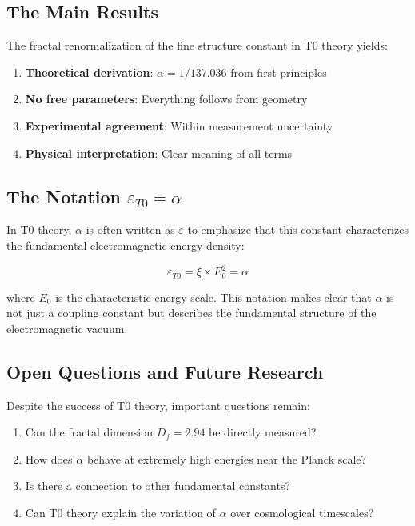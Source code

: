 \documentclass[12pt,a4paper]{article}
\theoremstyle{definition}
\begin{document}
	\subsection{The Main Results}
	
	The fractal renormalization of the fine structure constant in T0 theory yields:
	
	\begin{enumerate}
		\item \textbf{Theoretical derivation}: $\alpha = 1/137.036$ from first principles
		\item \textbf{No free parameters}: Everything follows from geometry
		\item \textbf{Experimental agreement}: Within measurement uncertainty
		\item \textbf{Physical interpretation}: Clear meaning of all terms
	\end{enumerate}
	
	\subsection{The Notation $\varepsilon_{T0} = \alpha$}
	
	In T0 theory, $\alpha$ is often written as $\varepsilon$ to emphasize that this constant characterizes the fundamental electromagnetic energy density:
	
	\begin{equation}
		\varepsilon_{T0} = \xi \times E_0^2 = \alpha
	\end{equation}
	
	where $E_0$ is the characteristic energy scale. This notation makes clear that $\alpha$ is not just a coupling constant but describes the fundamental structure of the electromagnetic vacuum.
	
	\subsection{Open Questions and Future Research}
	
	Despite the success of T0 theory, important questions remain:
	
	\begin{enumerate}
		\item Can the fractal dimension $D_f = 2.94$ be directly measured?
		\item How does $\alpha$ behave at extremely high energies near the Planck scale?
		\item Is there a connection to other fundamental constants?
		\item Can T0 theory explain the variation of $\alpha$ over cosmological timescales?
	\end{enumerate}
	
\end{document}
